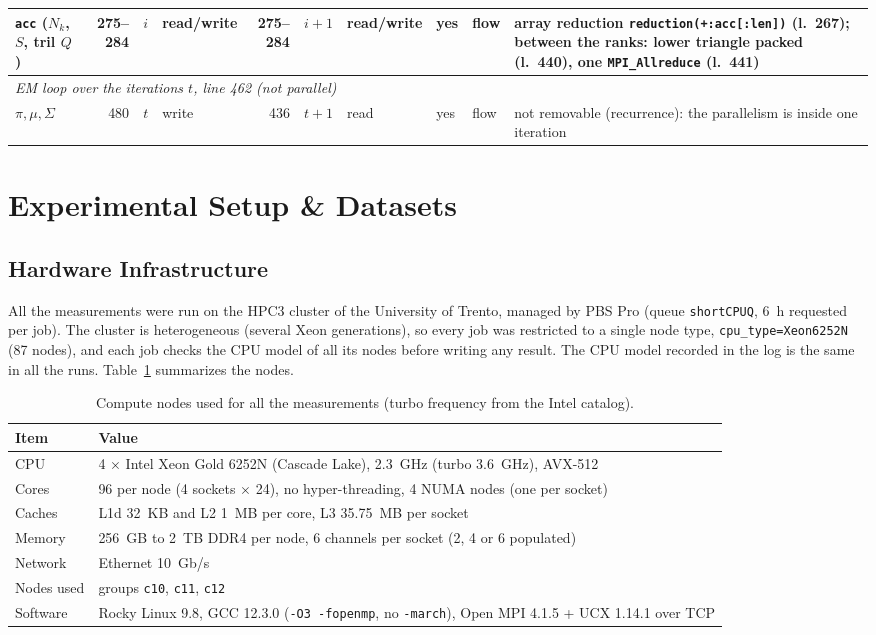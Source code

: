\documentclass[conference,onecolumn]{IEEEtran}
\begin{document}
\begin{table}[H]
\begin{tabular}{lrllrllllp{}}
\texttt{acc} ($N_k$, $S$, tril $Q$) & 275--284 & $i$ & read/write & 275--284 & $i+1$ & read/write & yes & flow & array reduction \texttt{reduction(+:acc[:len])} (l.~267); between the ranks: lower triangle packed (l.~440), one \texttt{MPI\_Allreduce} (l.~441) \\
\midrule
\multicolumn{10}{p{0.92\textwidth}}{\emph{EM loop over the iterations $t$, line 462 (not parallel)}} \\
$\pi,\mu,\Sigma$ & 480 & $t$ & write & 436 & $t+1$ & read & yes & flow & not removable (recurrence): the parallelism is inside one iteration \\
\bottomrule
\end{tabular}
\end{table}

\section{Experimental Setup \& Datasets}
\subsection{Hardware Infrastructure}\label{sec:hw}
All the measurements were run on the HPC3 cluster of the University of Trento, managed by PBS Pro (queue \texttt{shortCPUQ}, 6~h requested per job). The cluster is heterogeneous (several Xeon generations), so every job was restricted to a single node type, \texttt{cpu\_type=Xeon6252N} (87 nodes), and each job checks the CPU model of all its nodes before writing any result. The CPU model recorded in the log is the same in all the runs. Table~\ref{tab:hw} summarizes the nodes.

\begin{table}[H]
\centering
\caption{Compute nodes used for all the measurements (turbo frequency from the Intel catalog).}
\label{tab:hw}
\footnotesize
\begin{tabular}{lp{}}
\toprule
\textbf{Item} & \textbf{Value} \\
\midrule
CPU & 4 $\times$ Intel Xeon Gold 6252N (Cascade Lake), 2.3~GHz (turbo 3.6~GHz), AVX-512 \\
Cores & 96 per node (4 sockets $\times$ 24), no hyper-threading, 4 NUMA nodes (one per socket) \\
Caches & L1d 32~KB and L2 1~MB per core, L3 35.75~MB per socket \\
Memory & 256~GB to 2~TB DDR4 per node, 6 channels per socket (2, 4 or 6 populated) \\
Network & Ethernet 10~Gb/s \\
Nodes used & groups \texttt{c10}, \texttt{c11}, \texttt{c12} \\
Software & Rocky Linux 9.8, GCC 12.3.0 (\texttt{-O3 -fopenmp}, no \texttt{-march}), Open MPI 4.1.5 + UCX 1.14.1 over TCP \\
\bottomrule
\end{tabular}
\end{table}
\end{document}
